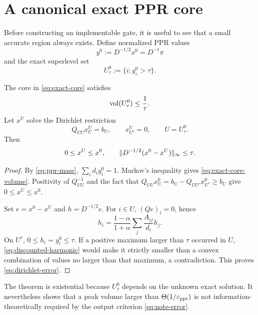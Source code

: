\section{A canonical exact PPR core}
\label{sec:exact-core}

Before constructing an implementable gate, it is useful to see that a small
accurate region always exists.  Define normalized PPR values
\begin{equation}
  y^0:=D^{-1/2}x^0=D^{-1}\pi
\end{equation}
and the exact superlevel set
\begin{equation}
  U_\tau^0:=\{i:y_i^0>\tau\}.
  \label{eq:exact-core}
\end{equation}

\begin{theorem}
\label{thm:exact-core}
The core in \cref{eq:exact-core} satisfies
\begin{equation}
  \operatorname{vol}(U_\tau^0)\leq\frac1\tau.
  \label{eq:exact-core-volume}
\end{equation}
Let $x^{U}$ solve the Dirichlet restriction
\begin{equation}
  Q_{UU}x_U^U=b_U,
  \qquad x_{U^c}^U=0,
  \qquad U=U_\tau^0.
  \label{eq:dirichlet}
\end{equation}
Then
\begin{equation}
  0\leq x^U\leq x^0,
  \qquad
  \lVert D^{-1/2}(x^0-x^U)\rVert_\infty\leq\tau.
  \label{eq:dirichlet-error}
\end{equation}
\end{theorem}

\begin{proof}
By \cref{eq:ppr-mass},
$\sum_i d_i y_i^0=1$.  Markov's inequality gives
\cref{eq:exact-core-volume}.  Positivity of $Q_{UU}^{-1}$ and the fact that
$Q_{UU}x_U^0=b_U-Q_{UU^c}x_{U^c}^0\geq b_U$ give
$0\leq x^U\leq x^0$.

Set $e=x^0-x^U$ and $h=D^{-1/2}e$.  For $i\in U$,
$(Qe)_i=0$, hence
\begin{equation}
  h_i=\frac{1-\alpha}{1+\alpha}
      \sum_j\frac{A_{ij}}{d_i}h_j.
  \label{eq:discounted-harmonic}
\end{equation}
On $U^c$, $0\leq h_i=y_i^0\leq\tau$.  If a positive maximum larger than
$\tau$ occurred in $U$, \cref{eq:discounted-harmonic} would make it strictly
smaller than a convex combination of values no larger than that maximum, a
contradiction.  This proves \cref{eq:dirichlet-error}.
\end{proof}

The theorem is existential because $U_\tau^0$ depends on the unknown exact
solution.  It nevertheless shows that a peak volume larger than
$\Theta(1/\varepsilon_{\mathrm{ppr}})$ is not information-theoretically required by the output
criterion \cref{eq:note-error}.
